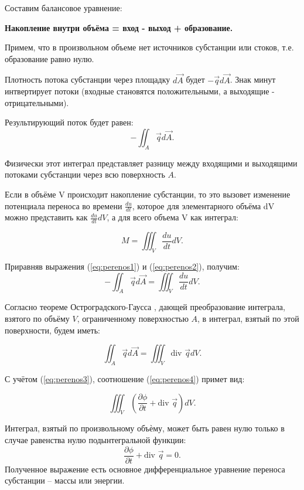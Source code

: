 Составим балансовое уравнение:

\textbf{Накопление внутри объёма = вход - выход + образование.}

Примем, что в произвольном объеме нет источников субстанции или стоков, т.е.
образование равно нулю.

Плотность потока субстанции через площадку $d\vec{A}$ будет $-\vec{q}d\vec{A}$.
Знак минут интвертирует потоки (входные становятся положительными, а выходящие - отрицательными).

Результирующий поток будет равен:
\begin{equation}
	- \iint_A \vec{q}d\vec{A}.
	\label{eq:perenos1}
\end{equation}

Физически этот интеграл представляет разницу между входящими
и выходящими потоками субстанции через всю поверхность $A$.

Если в объёме V происходит накопление субстанции, то это вызовет изменение
потенциала переноса во времени $\frac{du}{dt}$, которое для элементарного объёма dV можно
представить как $\frac{du}{dt} dV$, а для всего объема V как интеграл:

\begin{equation}
	M = \iiint_V \frac{du}{dt} dV.
	\label{eq:perenos2}
\end{equation}

Приравняв выражения (\ref{eq:perenos1}) и (\ref{eq:perenos2}), получим:
\begin{equation}
	-\iint_A \vec{q} d\vec{A} = \iiint_V \frac{du}{dt} dV.
	\label{eq:perenos3}
\end{equation}

Согласно теореме Остроградского-Гаусса \cite{Fichtenholz2015}, дающей преобразование интеграла, взятого по объёму $V$, ограниченному поверхностью $A$, в интеграл, взятый по этой поверхности, будем иметь:

\begin{equation}
	\iint_A \vec{q} d\vec{A} = \iiint_V \text{div } \vec{q} dV.
	\label{eq:perenos4}
\end{equation}

С учётом (\ref{eq:perenos3}), соотношение (\ref{eq:perenos4}) примет вид:

\[\iiint_V \left(\frac{\partial\phi}{\partial t} + \text{div }\vec{q}\right) dV.\]

Интеграл, взятый по произвольному объѐму, может быть равен нулю только в
случае равенства нулю подынтегральной функции:
$$
\frac{\partial\phi}{\partial t} + \text{div }\vec{q} = 0.
$$
Полученное выражение есть основное дифференциальное уравнение
переноса субстанции – массы или энергии.

